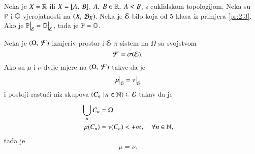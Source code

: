 \begin{kor} \label{kor:2.8}
    Neka je $X = \mathbb{R}$ ili $X = [{A}, \:{B}]$, $A, \; B \in \mathbb{R}, \; A < B$, s euklidskom topologijom.
    Neka su $\mathbb{P}$ i $\mathbb{O}$ vjerojatnosti na $({X}, \: {\mathcal{B}_{X}})$.
    Neka je $\mathcal{E}$ bilo koja od 5 klasa iz primjera \ref{pr:2.3}.
    Ako je $\restr{\masP}{\famE} = \restr{\masO}{\famE}$, tada je $\mathbb{P} = \mathbb{O}$.
\end{kor}

\begin{zad} \label{zad:2.9}
    Neka je $(\Omega, \: \mathcal{F})$ izmjeriv prostor i $\mathcal{E}$ $\pi$-sistem na $\Omega$ sa svojstvom
    \begin{equation*}
        \mathcal{F} = \sigma({\mathcal{E}}).
    \end{equation*}
    Ako su $\mu$ i $\nu$ dvije mjere na $(\Omega, \: \mathcal{F})$ takve da je
    \begin{equation*}
        \restr{\mu}{\famE} = \restr{\nu}{\famE}
    \end{equation*}
    i postoji rastu\' ci niz skupova $({C_n} \: | \: {n \in \mathbb{N}}) \subseteq \mathcal{E}$ takav da je
    \begin{equation*}
        \begin{aligned}
            \bigcup\limits_{n}^{}C_n &= \Omega\\
            \mu({C_n}) &= \nu(C_n) < +\infty, \quad \forall n \in \mathbb{N},
        \end{aligned}
    \end{equation*}
    tada je
    \begin{equation*}
        \mu = \nu.
    \end{equation*}
\end{zad}

